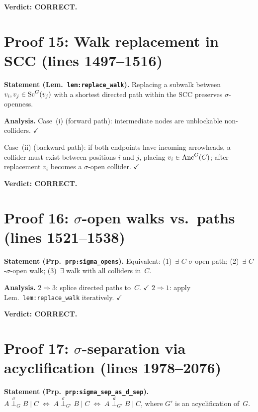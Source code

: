 \documentclass{article}
\begin{document}
\textbf{Verdict: CORRECT.}

\section{Proof 15: Walk replacement in SCC (lines 1497--1516)}

\textbf{Statement (Lem.\ \texttt{lem:replace\_walk}).}
Replacing a subwalk between $v_i,v_j\in\mathrm{Sc}^G(v_j)$ with a shortest directed
path within the SCC preserves $\sigma$-openness.

\textbf{Analysis.}
Case~(i) (forward path): intermediate nodes are unblockable non-colliders.  $\checkmark$

Case~(ii) (backward path): if both endpoints have incoming arrowheads, a collider
must exist between positions $i$ and $j$, placing $v_i\in\mathrm{Anc}^G(C)$; after
replacement $v_i$ becomes a $\sigma$-open collider.  $\checkmark$

\textbf{Verdict: CORRECT.}

\section{Proof 16: $\sigma$-open walks vs.\ paths (lines 1521--1538)}

\textbf{Statement (Prp.\ \texttt{prp:sigma\_opens}).}
Equivalent: (1)~$\exists$ $C$-$\sigma$-open path; (2)~$\exists$ $C$-$\sigma$-open
walk; (3)~$\exists$ walk with all colliders in~$C$.

\textbf{Analysis.}
$2\Rightarrow 3$: splice directed paths to~$C$.  $\checkmark$\quad
$2\Rightarrow 1$: apply Lem.~\texttt{lem:replace\_walk} iteratively.  $\checkmark$

\textbf{Verdict: CORRECT.}

\section{Proof 17: $\sigma$-separation via acyclification (lines 1978--2076)}

\textbf{Statement (Prp.\ \texttt{prp:sigma\_sep\_as\_d\_sep}).}
$A\stackrel{\sigma}{\perp}_G B\mid C \;\iff\;
 A\stackrel{\sigma}{\perp}_{G'} B\mid C \;\iff\;
 A\stackrel{d}{\perp}_{G'} B\mid C$,
where $G'$ is an acyclification of~$G$.
\end{document}
